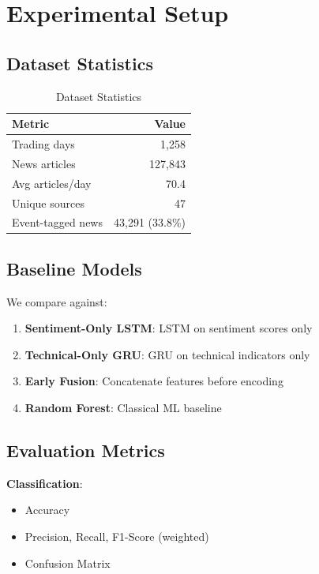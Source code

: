 \documentclass[conference]{IEEEtran}
\begin{document}
\section{Experimental Setup}

\subsection{Dataset Statistics}

\begin{table}[ht]
\centering
\caption{Dataset Statistics}
\begin{tabular}{|l|r|}
\hline
\textbf{Metric} & \textbf{Value} \\
\hline
Trading days & 1,258 \\
News articles & 127,843 \\
Avg articles/day & 70.4 \\
Unique sources & 47 \\
Event-tagged news & 43,291 (33.8\%) \\
\hline
\end{tabular}
\label{tab:dataset}
\end{table}

\subsection{Baseline Models}

We compare against:

\begin{enumerate}
    \item \textbf{Sentiment-Only LSTM}: LSTM on sentiment scores only
    \item \textbf{Technical-Only GRU}: GRU on technical indicators only
    \item \textbf{Early Fusion}: Concatenate features before encoding
    \item \textbf{Random Forest}: Classical ML baseline
\end{enumerate}

\subsection{Evaluation Metrics}

\textbf{Classification}:
\begin{itemize}
    \item Accuracy
    \item Precision, Recall, F1-Score (weighted)
    \item Confusion Matrix
\end{itemize}
\end{document}
